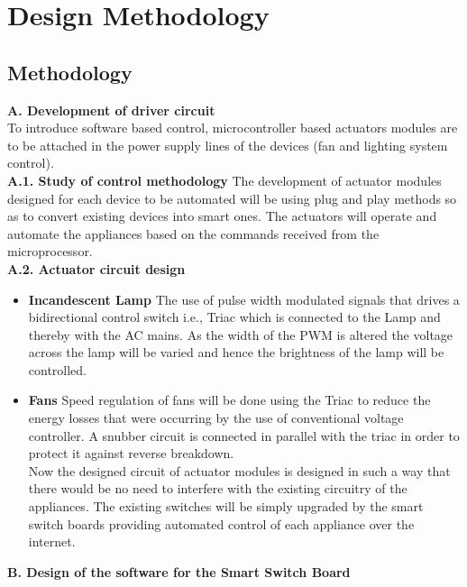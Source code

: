  \chapter{Design Methodology}
        \section{Methodology}
        \textbf{A. Development of driver circuit} \\
        
        To introduce software based control, microcontroller based actuators modules are to be attached in the power supply lines of the devices (fan and lighting system control).\\ 
        
        \textbf{A.1. Study of control methodology} The development of actuator modules designed for each device to be automated will be using plug and play methods so as to convert existing devices into smart ones. The actuators will operate and automate the appliances based on the commands received from the microprocessor.\\
        
        \textbf{A.2. Actuator circuit design} 
        \begin{itemize}
        \item \textbf{Incandescent Lamp} The use of pulse width modulated signals that drives a bidirectional control switch i.e., Triac which is connected to the Lamp and thereby with the AC mains. As the width of the PWM is altered the voltage across the lamp will be varied and hence the brightness of the lamp will be controlled.
         \item \textbf{Fans} Speed regulation of fans will be done using the Triac to reduce the energy losses that were occurring by the use of conventional voltage controller. A snubber circuit is connected in parallel with the triac in order to protect it against reverse breakdown.\\
         
         
         Now the designed circuit of actuator modules is designed in such a way that there would be no need to interfere with the existing circuitry of the appliances. The existing switches will be simply upgraded by the smart switch boards providing automated control of each appliance over the internet.
        \end{itemize}
        \textbf{B.  Design of the software for the Smart Switch Board} \\
        
